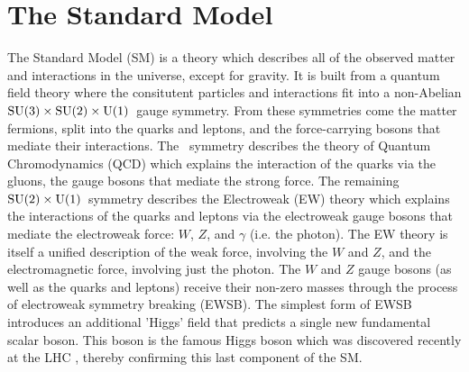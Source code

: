 






\section{The Standard Model}

The Standard Model (SM) is a theory which describes all of the
observed matter and interactions in the universe, except for gravity.
It is built from a quantum field theory where the consitutent particles
and interactions fit into a non-Abelian 
$\textrm{SU(3)}\times\textrm{SU(2)}\times\textrm{U(1)}$~gauge symmetry.
From these symmetries come the matter fermions, split 
into the quarks and leptons, and the force-carrying bosons
that mediate their interactions.
The \suthree~symmetry describes the theory of Quantum Chromodynamics (QCD)
which explains the interaction of the quarks via the gluons, the
gauge bosons that mediate the strong force.
The remaining $\textrm{SU(2)}\times\textrm{U(1)}$~symmetry 
describes the Electroweak (EW) theory which explains
the interactions of the quarks and leptons via the 
electroweak gauge bosons that mediate
the electroweak force: $W$, $Z$, and $\gamma$ (i.e. the photon).
The EW theory is itself a unified description of the weak force,
involving the $W$ and $Z$, and the electromagnetic force, involving
just the photon.
The $W$ and $Z$ gauge bosons (as well as the quarks and leptons) receive
their non-zero masses through the process of electroweak symmetry
breaking (EWSB). The simplest form of EWSB
introduces an additional 'Higgs' field that
predicts a single new fundamental scalar boson. This boson is the
famous Higgs boson which was discovered recently at the 
LHC \cite{Aad20121,Chatrchyan:2012xdj}, thereby
confirming this last component of the SM.

